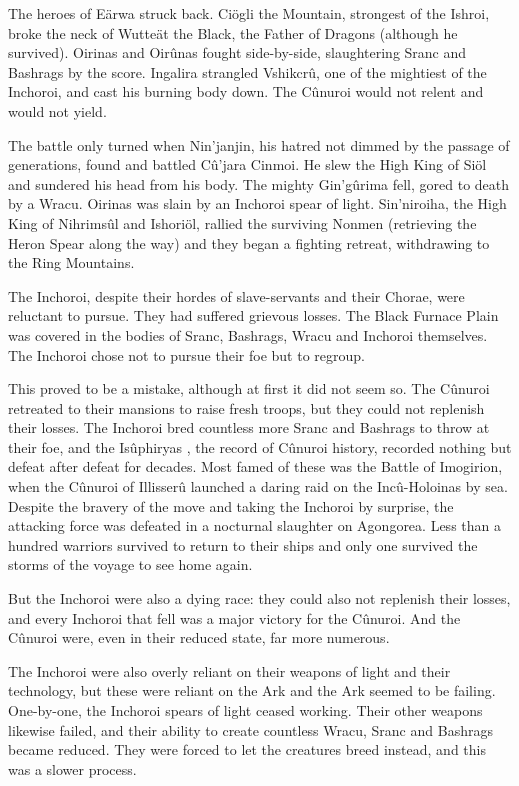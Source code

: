 \documentclass[]{book}
\begin{document}
The heroes of Eärwa struck back. Ciögli the Mountain, strongest of the Ishroi, broke
the neck of Wutteät the Black, the Father of Dragons (although he survived). Oirinas
and Oirûnas fought side-by-side, slaughtering Sranc and Bashrags by the score. Ingalira
strangled Vshikcrû, one of the mightiest of the Inchoroi, and cast his burning body
down. The Cûnuroi would not relent and would not yield.

The battle only turned when Nin'janjin, his hatred not dimmed by the passage of
generations, found and battled Cû'jara Cinmoi. He slew the High King of Siöl and
sundered his head from his body. The mighty Gin'gûrima fell, gored to death by a
Wracu. Oirinas was slain by an Inchoroi spear of light. Sin'niroiha, the High King of
Nihrimsûl and Ishoriöl, rallied the surviving Nonmen (retrieving the Heron Spear
along the way) and they began a fighting retreat, withdrawing to the Ring Mountains.

The Inchoroi, despite their hordes of slave-servants and their Chorae, were reluctant to
pursue. They had suffered grievous losses. The Black Furnace Plain was covered in the
bodies of Sranc, Bashrags, Wracu and Inchoroi themselves. The Inchoroi chose not to
pursue their foe but to regroup.

This proved to be a mistake, although at first it did not seem so. The Cûnuroi retreated
to their mansions to raise fresh troops, but they could not replenish their losses. The
Inchoroi bred countless more Sranc and Bashrags to throw at their foe, and the Isûphiryas , the record of Cûnuroi history, recorded nothing but defeat after defeat for
decades. Most famed of these was the Battle of Imogirion, when the Cûnuroi of
Illisserû launched a daring raid on the Incû-Holoinas by sea. Despite the bravery of the
move and taking the Inchoroi by surprise, the attacking force was defeated in a
nocturnal slaughter on Agongorea. Less than a hundred warriors survived to return to
their ships and only one survived the storms of the voyage to see home again.

But the Inchoroi were also a dying race: they could also not replenish their losses, and
every Inchoroi that fell was a major victory for the Cûnuroi. And the Cûnuroi were,
even in their reduced state, far more numerous.

The Inchoroi were also overly reliant on their weapons of light and their technology,
but these were reliant on the Ark and the Ark seemed to be failing. One-by-one, the
Inchoroi spears of light ceased working. Their other weapons likewise failed, and their
ability to create countless Wracu, Sranc and Bashrags became reduced. They were
forced to let the creatures breed instead, and this was a slower process.
\end{document}
